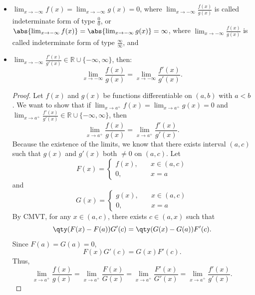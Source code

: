 \documentclass[a4paper,12pt]{report}
\begin{document}
\begin{itemize}
\begin{itemize}
Let $f(x)$ and $g(x)$ be functions differentiable on $(-\infty,a)$. If
\bit
\item $\lim_{x\to -\infty}f(x)=\lim_{x\to -\infty}g(x)=0$, where $\lim_{x\to -\infty}\frac{f(x)}{g(x)}$ is called indeterminate form of type $\frac{0}{0}$, or $\abs{\lim_{x\to -\infty}f(x)}=\abs{\lim_{x\to -\infty}g(x)}=\infty$, where $\lim_{x\to -\infty}\frac{f(x)}{g(x)}$ is called indeterminate form of type $\frac{\infty}{\infty}$, and
\item $\lim_{x\to -\infty}\frac{f'(x)}{g'(x)}\in\mathbb{R}\cup\{-\infty,\infty\}$,
\eit
then:
\[\lim_{x\to -\infty}\frac{f(x)}{g(x)}=\lim_{x\to -\infty}\frac{f'(x)}{g'(x)}.\]
\begin{proof}
Let $f(x)$ and $g(x)$ be functions differentiable on $(a,b)$ with $a<b$. We want to show that if $\lim_{x\to a^+}f(x)=\lim_{x\to a^+}g(x)=0$ and $\lim_{x\to a^+}\frac{f'(x)}{g'(x)}\in\mathbb{R}\cup\{-\infty,\infty\}$, then
\[\lim_{x\to a^+}\frac{f(x)}{g(x)}=\lim_{x\to a^+}\frac{f'(x)}{g'(x)}.\]
Because the existence of the limits, we know that there exists interval $(a,c)$ such that $g(x)$ and $g'(x)$ both $\neq 0$ on $(a,c)$. Let
\[F(x)=\begin{cases}f(x),\quad & x\in (a,c)\\
0,\quad & x=a\end{cases}\]
and
\[G(x)=\begin{cases}g(x),\quad & x\in (a,c)\\
0,\quad & x=a\end{cases}\]
By CMVT, for any $x\in (a,c)$, there exists $c\in (a,x)$ such that
\[\qty(F(x)-F(a))G'(c)=\qty(G(x)-G(a))F'(c).\]
Since $F(a)=G(a)=0$,
\[F(x)G'(c)=G(x)F'(c).\]
Thus,
\[\lim_{x\to a^+}\frac{f(x)}{g(x)}=\lim_{x\to a^+}\frac{F(x)}{G(x)}=\lim_{x\to a^+}\frac{F'(x)}{G'(x)}=\lim_{x\to a^+}\frac{f'(x)}{g'(x)}.\]


\end{proof}
\end{itemize}
\end{itemize}
\end{document}
